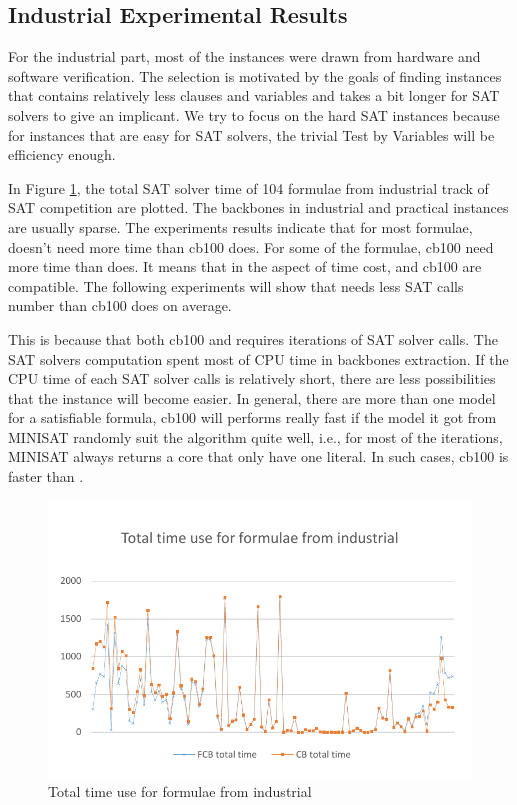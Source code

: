 \subsection{Industrial Experimental Results}

For the industrial part, most of the instances were drawn from hardware and software verification. The selection is motivated by the goals of finding instances that contains relatively less clauses and variables and takes a bit longer for SAT solvers to give an implicant. We try to focus on the hard SAT instances because for instances that are easy for SAT solvers, the trivial Test by Variables will be efficiency enough.

In Figure \ref{fig:ind-time}, the total SAT solver time of 104 formulae from industrial track of SAT competition are plotted. The backbones in industrial and practical instances are usually sparse. The experiments results indicate that for most formulae, \tool doesn't need more time than cb100 does. For some of the formulae, cb100 need more time than \tool does. It means that in the aspect of time cost, \tool and cb100 are compatible. The following experiments will show that \tool needs less SAT calls number than cb100 does on average.

This is because that both cb100 and \tool requires iterations of SAT solver calls. The SAT solvers computation spent most of CPU time in backbones extraction. If the CPU time of each SAT solver calls is relatively short, there are less possibilities that the instance will become easier. In general, there are more than one model for a satisfiable formula, cb100 will performs really fast if the model it got from MINISAT randomly suit the algorithm quite well, i.e., for most of the iterations, MINISAT always returns a core that only have one literal. In such cases, cb100 is faster than \tool.

\begin{figure}
    \centering
    \includegraphics[scale=0.7]{ind.pdf}
   \caption{Total time use for formulae from industrial}
   \label{fig:ind-time}
\end{figure}


